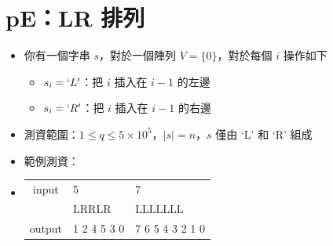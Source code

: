 \documentclass[12pt]{article}
\begin{document}
\section*{pE：LR 排列}

\begin{itemize}[label={}, itemsep=0pt]
    \item 你有一個字串 $s$，對於一個陣列 $V=\{0\}$，對於每個 $i$ 操作如下
    \begin{itemize}[label={-}, itemsep=0pt]
        \item $s_i = `L'$：把 $i$ 插入在 $i-1$ 的左邊
        \item $s_i = `R'$：把 $i$ 插入在 $i-1$ 的右邊
    \end{itemize}
    \item 測資範圍：$1 \leq q \leq 5 \times 10^5$，$\mid s \mid = n$，$s$ 僅由 `L' 和 `R' 組成
    \item 範例測資：
    \item
    \centering
    \begin{tabular}{|c|l|l|}
        \hline
        input                  & 5           & 7               \\
        \multicolumn{1}{|l|}{} & LRRLR       & LLLLLLL         \\ \hline
        output                 & 1 2 4 5 3 0 & 7 6 5 4 3 2 1 0 \\ \hline
    \end{tabular}
\end{itemize}
\end{document}
